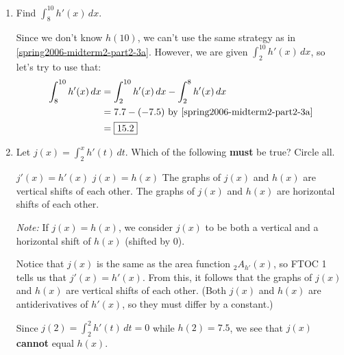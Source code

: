 \documentclass{article}
\begin{document}
\begin{enumerate}
\begin{enumerate}[resume]
  \item
    \begin{problem}[\vfill]
      Find $\displaystyle \int_{8}^{10} h'(x)\,dx$.
    \end{problem}

    \begin{solution}
      Since we don't know $h(10)$, we can't use the same strategy as in
      \ref{spring2006-midterm2-part2-3a}.  However, we are given
      $\displaystyle \int_2^{10} h'(x)\,dx$, so let's try to use that:
      \begin{align*}
        \int_8^{10} h'(x)\,dx &= \int_2^{10} h'(x)\,dx - \int_2^8 h'(x)\,dx
        \\
        &= 7.7 - (-7.5) \text{ by \ref{spring2006-midterm2-part2-3a}} \\
        &= \boxed{15.2}
      \end{align*}
    \end{solution}

    \item \label{spring2010-final-9-parts-2} 
    \begin{problem}
      Let $\displaystyle j(x) = \int_2^x h'(t)\,dt$.  Which of the
      following \textbf{must} be true?  Circle all.
      \begin{enumerate}[label=\protect\maybecircle{\Alph*.}]
      \circleitem $j'(x) = h'(x)$
      \plainitem $j(x) = h(x)$
      \circleitem The graphs of $j(x)$ and $h(x)$ are vertical shifts of
        each other.
      \plainitem The graphs of $j(x)$ and $h(x)$ are horizontal shifts of
        each other.
      \end{enumerate}      

      \emph{Note:} If $j(x) = h(x)$, we consider $j(x)$ to be both a
      vertical and a horizontal shift of $h(x)$ (shifted by 0).
    \end{problem}    

    \begin{solution}
      Notice that $j(x)$ is the same as the area function $_2 A_{h'}(x)$,
      so FTOC 1 tells us that $j'(x) = h'(x)$.  From this, it follows that
      the graphs of $j(x)$ and $h(x)$ are vertical shifts of each other.
      (Both $j(x)$ and $h(x)$ are antiderivatives of $h'(x)$, so they must
      differ by a constant.)

      Since $\displaystyle j(2) = \int_2^2 h'(t)\,dt = 0$ while $h(2) =
      7.5$, we see that $j(x)$ \textbf{cannot} equal $h(x)$.
    \end{solution}


\end{enumerate}
\end{enumerate}
\end{document}

